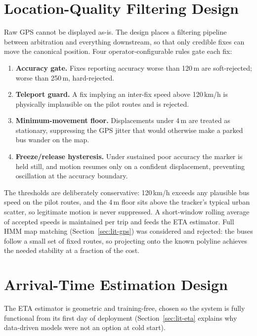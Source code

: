 \section{Location-Quality Filtering Design}
\label{sec:design-filter}
Raw GPS cannot be displayed as-is. The design places a filtering pipeline
between arbitration and everything downstream, so that only credible
fixes can move the canonical position. Four operator-configurable rules
gate each fix:

\begin{enumerate}
  \item \textbf{Accuracy gate.} Fixes reporting accuracy worse than
  120\,m are soft-rejected; worse than 250\,m, hard-rejected.
  \item \textbf{Teleport guard.} A fix implying an inter-fix speed above
  120\,km/h is physically implausible on the pilot routes and is
  rejected.
  \item \textbf{Minimum-movement floor.} Displacements under 4\,m are
  treated as stationary, suppressing the GPS jitter that would otherwise
  make a parked bus wander on the map.
  \item \textbf{Freeze/release hysteresis.} Under sustained poor
  accuracy the marker is held still, and motion resumes only on a
  confident displacement, preventing oscillation at the accuracy
  boundary.
\end{enumerate}

The thresholds are deliberately conservative: 120\,km/h exceeds any
plausible bus speed on the pilot routes, and the 4\,m floor sits above
the tracker's typical urban scatter, so legitimate motion is never
suppressed. A short-window rolling average of accepted speeds is
maintained per trip and feeds the ETA estimator. Full HMM map matching
(Section~\ref{sec:lit-gps}) was considered and rejected: the buses follow
a small set of fixed routes, so projecting onto the known polyline
achieves the needed stability at a fraction of the cost.

\section{Arrival-Time Estimation Design}
\label{sec:design-eta}
The ETA estimator is geometric and training-free, chosen so the system
is fully functional from its first day of deployment
(Section~\ref{sec:lit-eta} explains why data-driven models were not an
option at cold start).

